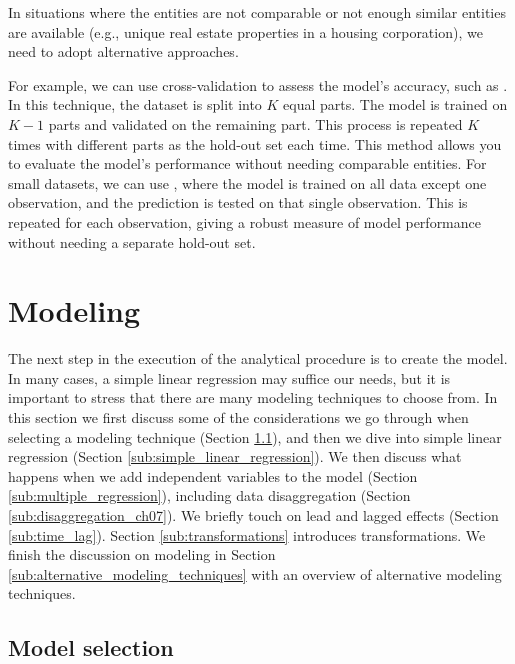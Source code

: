 \bigskip
In situations where the entities are not comparable or not enough similar entities are available (e.g., unique real estate properties in a housing corporation), we need to adopt alternative approaches.

For example, we can use cross-validation to assess the model’s accuracy, such as . 
In this technique, the dataset is split into $K$ equal parts.
The model is trained on $K-1$ parts and validated on the remaining part. 
This process is repeated $K$ times with different parts as the hold-out set each time. 
This method allows you to evaluate the model's performance without needing comparable entities.
For small datasets, we can use , where the model is trained on all data except one observation, and the prediction is tested on that single observation. 
This is repeated for each observation, giving a robust measure of model performance without needing a separate hold-out set.


\section{Modeling} %
\label{sec:modeling}

The next step in the execution of the analytical procedure is to create the model. In many cases, a simple linear regression may suffice our needs, but it is important to stress that there are many modeling techniques to choose from. In this section we first discuss some of the considerations we go through when selecting a modeling technique (Section \ref{sub:model_selection}), and then we dive into simple linear regression (Section \ref{sub:simple_linear_regression}). We then discuss what happens when we add independent variables to the model (Section \ref{sub:multiple_regression}), including data disaggregation (Section \ref{sub:disaggregation_ch07}). We briefly touch on lead and lagged effects (Section \ref{sub:time_lag}). Section \ref{sub:transformations} introduces transformations. We finish the discussion on modeling in Section \ref{sub:alternative_modeling_techniques} with an overview of alternative modeling techniques.

\subsection{Model selection} %
\label{sub:model_selection}

